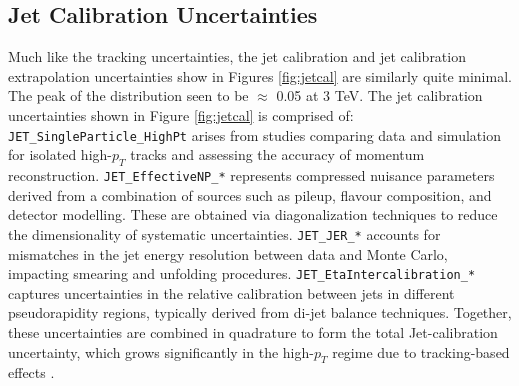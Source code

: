 \subsection{Jet Calibration Uncertainties} \label{sec:jetcalunc}

Much like the tracking uncertainties, the jet calibration and jet calibration extrapolation uncertainties show in Figures \ref{fig:jetcal} are similarly quite minimal. The peak of the distribution seen to be $\approx$ 0.05 at 3 TeV. The jet calibration uncertainties shown in Figure \ref{fig:jetcal} is comprised of: \verb|JET_SingleParticle_HighPt| arises from studies comparing data and simulation for isolated high-$p_T$ tracks and assessing the accuracy of momentum reconstruction. \verb|JET_EffectiveNP_*| represents compressed nuisance parameters derived from a combination of sources such as pileup, flavour composition, and detector modelling. These are obtained via diagonalization techniques to reduce the dimensionality of systematic uncertainties. \verb|JET_JER_*| accounts for mismatches in the jet energy resolution between data and Monte Carlo, impacting smearing and unfolding procedures. \verb|JET_EtaIntercalibration_*| captures uncertainties in the relative calibration between jets in different pseudorapidity regions, typically derived from di-jet balance techniques. Together, these uncertainties are combined in quadrature to form the total Jet-calibration uncertainty, which grows significantly in the high-$p_T$ regime due to tracking-based effects \cite{JER-JES}.
